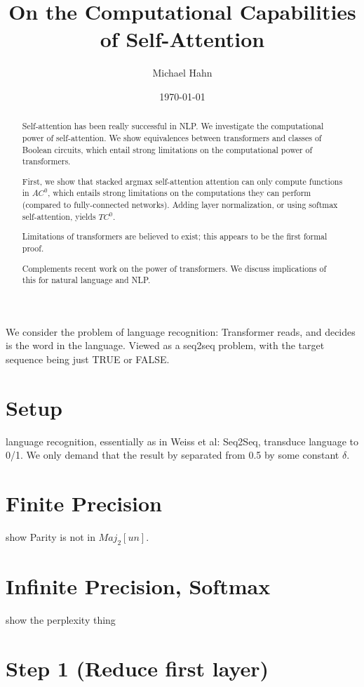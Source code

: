 \documentclass[11pt,a4paper]{article}
\title{On the Computational Capabilities of Self-Attention}
\author{Michael Hahn}
\date{\today}
\begin{document}
\maketitle
\begin{abstract}
    Self-attention has been really successful in NLP.
    We investigate the computational power of self-attention.
    We show equivalences between transformers and classes of Boolean circuits, which entail strong limitations on the computational power of transformers.
    
    First, we show that stacked argmax self-attention attention can only compute functions in $AC^0$, which entails strong limitations on the computations they can perform (compared to fully-connected networks).
    Adding layer normalization, or using softmax self-attention, yields $TC^0$.
    
    Limitations of transformers are believed to exist; this appears to be the first formal proof.
    
    Complements recent work on the power of transformers.
    We discuss implications of this for natural language and NLP.
\end{abstract}


We consider the problem of language recognition: Transformer reads, and decides is the word in the language. Viewed as a seq2seq problem, with the target sequence being just TRUE or FALSE.



\section{Setup}

language recognition, essentially as in Weiss et al: Seq2Seq, transduce language to 0/1. We only demand that the result by separated from 0.5 by some constant $\delta$.


\section{Finite Precision}

show Parity is not in $Maj_2[un]$.

\section{Infinite Precision, Softmax}

show the perplexity thing

\section{Step 1 (Reduce first layer)}
\end{document}
